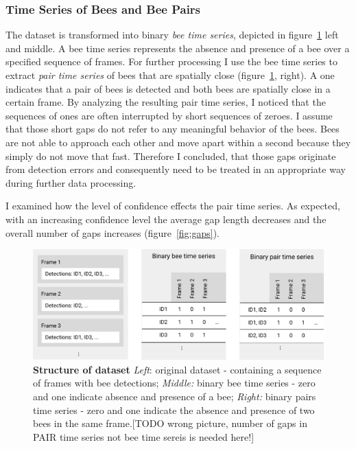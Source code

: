 \subsubsection{Time Series of Bees and Bee Pairs}
\label{subsec:tracking}

The dataset is transformed into binary \emph{bee time series}, depicted in figure~\ref{fig:structure} left and middle.
A bee time series represents the absence and presence of a bee over a specified sequence of frames.
For further processing I use the bee time series to extract \emph{pair time series} of bees that are spatially close (figure~\ref{fig:structure}, right).
A one indicates that a pair of bees is detected and both bees are spatially close in a certain frame.
By analyzing the resulting pair time series, I noticed that the sequences of ones are often interrupted by short sequences of zeroes.
I assume that those short gaps do not refer to any meaningful behavior of the bees. Bees are not able to approach each other and move apart within a second because they simply do not move that fast.
Therefore I concluded, that those gaps originate from detection errors and consequently need to be treated in an appropriate way during further data processing.

I examined how the level of confidence effects the pair time series.
As expected, with an increasing confidence level the average gap length decreases and the overall number of gaps increases (figure~\ref{fig:gaps}).

\begin{figure}[htb]
	\centering
	\includegraphics[width=1.0\textwidth]{Figures/structure}
	\caption[Structure of dataset]{\textbf{Structure of dataset} \emph{Left}: original dataset - containing a sequence of frames with bee detections; \emph{Middle:} binary bee time series - zero and one indicate absence and presence of a bee; \emph{Right:} binary pairs time series - zero and one indicate the absence and presence of two bees in the same frame.[TODO wrong picture, number of gaps in PAIR time series not bee time sereis is needed here!]}
	\label{fig:structure}
\end{figure}

